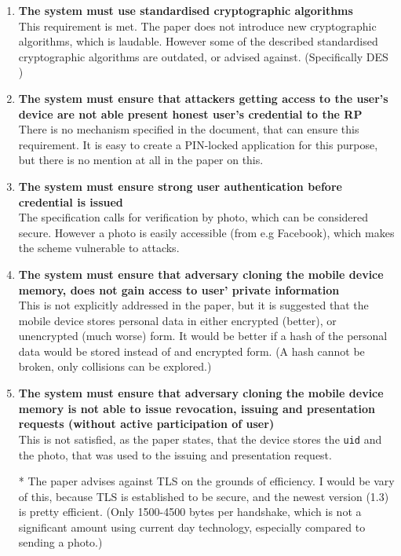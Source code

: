 \documentclass{article}
\begin{document}
\begin{enumerate}
		\item\textbf{The system must use standardised cryptographic algorithms}\\
		This requirement is met. The paper does not introduce new cryptographic algorithms, which is laudable. However some of the described standardised cryptographic algorithms are outdated, or advised against. (Specifically DES \cite{nist2005deswithdrawal})
		
		\item\textbf{The system must ensure that attackers getting access to the user’s device are not able present honest user’s credential to the RP}\\
		There is no mechanism specified in the document, that can ensure this requirement. It is easy to create a PIN-locked application for this purpose, but there is no mention at all in the paper on this.
		
		\item\textbf{The system must ensure strong user authentication before credential is issued}\\
		The specification calls for verification by photo, which can be considered secure. \cite{photo} However a photo is easily accessible (from e.g Facebook), which makes the scheme vulnerable to attacks.
		
		\item\textbf{The system must ensure that adversary cloning the mobile device memory, does not gain access to user’ private information}\\
		This is not explicitly addressed in the paper, but it is suggested that the mobile device stores personal data in either encrypted (better), or unencrypted (much worse) form. It would be better if a hash of the personal data would be stored instead of and encrypted form. (A hash cannot be broken, only collisions can be explored.)
		
		\item\textbf{The system must ensure that adversary cloning the mobile device memory is not able to issue revocation, issuing and presentation requests (without active participation of user)}\\
		This is not satisfied, as the paper states, that the device stores the \texttt{uid} and the photo, that was used to the issuing and presentation request.
		
		\item[*] The paper advises against TLS on the grounds of efficiency. I would be vary of this, because TLS is established to be secure, and the newest version (1.3) is pretty efficient. (Only 1500-4500 bytes per handshake, which is not a significant amount using current day technology, especially compared to sending a photo.) \cite{tls_rfc}
	\end{enumerate}
\end{document}
